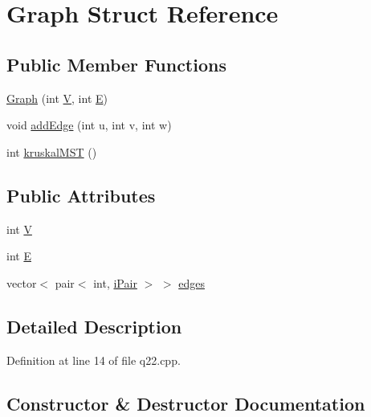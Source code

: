 \hypertarget{struct_graph}{}\section{Graph Struct Reference}
\label{struct_graph}
\subsection*{Public Member Functions}
\begin{DoxyCompactItemize}
\item 
\hyperlink{struct_graph_ad3b98f95ee53f91afad11b8eaddc35e0}{Graph} (int \hyperlink{struct_graph_a2b722f7cfa7a21e4cb5fae488b3d4dcc}{V}, int \hyperlink{struct_graph_a3ce250f958f7e96ffd9eb06780c21fbe}{E})
\item 
void \hyperlink{struct_graph_ab7b4b061fdba1d19a5fbcee110a319bd}{add\+Edge} (int u, int v, int w)
\item 
int \hyperlink{struct_graph_acec80ad3aef831280f7a05217270fb7b}{kruskal\+M\+ST} ()
\end{DoxyCompactItemize}
\subsection*{Public Attributes}
\begin{DoxyCompactItemize}
\item 
int \hyperlink{struct_graph_a2b722f7cfa7a21e4cb5fae488b3d4dcc}{V}
\item 
int \hyperlink{struct_graph_a3ce250f958f7e96ffd9eb06780c21fbe}{E}
\item 
vector$<$ pair$<$ int, \hyperlink{q22_8cpp_a18fc5862b3095bd9855a9e15c67b392d}{i\+Pair} $>$ $>$ \hyperlink{struct_graph_a6694959510dc3092c7a02efa56ed7a8f}{edges}
\end{DoxyCompactItemize}


\subsection{Detailed Description}


Definition at line 14 of file q22.\+cpp.



\subsection{Constructor \& Destructor Documentation}
\mbox{\label{struct_graph_ad3b98f95ee53f91afad11b8eaddc35e0}} 
